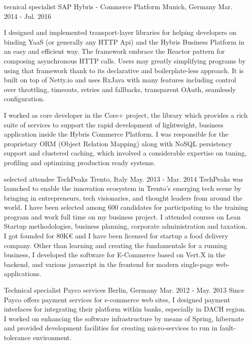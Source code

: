 \begin{cventries}
  \cventry
    {tecnical specialist} %
    {SAP Hybris - Commerce Platform} %
    {Munich, Germany} %
    {Mar. 2014 - Jul. 2016} %
    {
      \begin{cvitems}
        \item I designed and implemented transport-layer libraries for helping developers on binding YaaS (or generally any HTTP Api) and the Hybris Business Platform in an easy and efficient way.
      The framework embrace the Reactor pattern for composing asynchronous HTTP calls. Users may greatly simplifying programs by using that framework thank to its declarative and boilerplate-less
      approach. It is built on top of Netty.io and uses RxJava with many features including control over throttling, timeouts, retries and fallbacks, transparent OAuth, seamlessly configuration.
        \item I worked as core developer in the Core+ project, the library which provides a rich suite of services to support the rapid development of lightweight, business application inside the
      Hybris Commerce Platform. I was responsible for the proprietary ORM (Object Relation Mapping) along with NoSQL persistency support and clustered caching, which involved a considerable expertise on tuning,
      profiling and optimizing production ready systems.
      \end{cvitems}
    }

  \cventry
    {selected attendee} %
    {TechPeaks} %
    {Trento, Italy} %
    {May. 2013 - Mar. 2014} %
    {
    TechPeaks was launched to enable the innovation ecosystem in Trento’s emerging tech scene by bringing in entrepreneurs, tech visionaries, and thought leaders from around the world.
    I have been selected among 600 candidates for participating to the training program and work full time on my business project.
    I attended courses on Lean Startup methodologies, business planning, corporate administration and taxation.
    I got founded for 80K€ and I have been licensed for startup a food delivery company.
    Other than learning and creating the fundamentals for a running business, I developed the software for E-Commerce based on Vert.X in the backend, and various javascript in the frontend
    for modern single-page web-applications.
    }

  \cventry
    {Technical specialist} %
    {Payco services} %
    {Berlin, Germany} %
    {Mar. 2012 - May. 2013} %
    {
      Since Payco offers payment services for e-commerce web sites, I designed payment interfaces for integrating their platform
      within banks, especially in DACH region. I worked on enhancing the software infrastructure by means of
      Spring, hibernate and provided development facilities for creating micro-services to run in fault-tolerance environment.
    }


\end{cventries}
